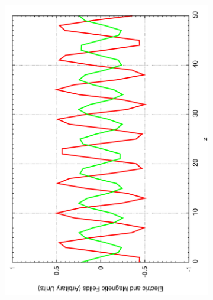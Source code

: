 \begin{figure}[ht]
        \begin{subfigure}[ht]{0.45\textwidth}
                \centering
                \includegraphics[angle=270, width=\textwidth]{highfreqsine3.pdf}
        \end{subfigure}
        ~
        \begin{subfigure}[ht]{0.45\textwidth}
                \centering

\end{subfigure}
\end{figure}
